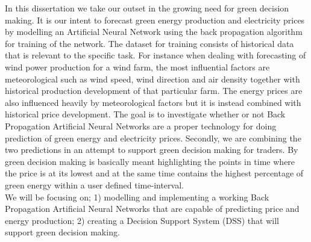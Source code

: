 In this dissertation we take our outset in the growing need for green decision making. It is our intent to forecast green energy production and electricity prices by modelling an Artificial Neural Network using the back propagation algorithm for training of the network. The dataset for training consists of historical data that is relevant to the specific task. For instance when dealing with forecasting of wind power production for a wind farm, the most influential factors are meteorological such as wind speed, wind direction and air density together with historical production development of that particular farm. The energy prices are also influenced heavily by meteorological factors but it is instead combined with historical price development.
The goal is to investigate whether or not Back Propagation Artificial Neural Networks are a proper technology for doing prediction of green energy and electricity prices. Secondly, we are combining the two predictions in an attempt to support green decision making for traders. By green decision making is basically meant highlighting the points in time where the price is at its lowest and at the same time contains the highest percentage of green energy within a user defined time-interval.
\\[0.5cm]
We will be focusing on; 1) modelling and implementing a working Back Propagation Artificial Neural Networks that are capable of predicting price and energy production; 2) creating a Decision Support System (DSS) that will support green decision making.